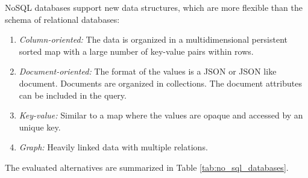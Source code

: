 \acs{NoSQL} databases support new data structures, which are more flexible than the schema of relational databases:
 \begin{enumerate}
 	\item \textit{Column-oriented:} The data is organized in a multidimensional persistent sorted map with a large number of key-value pairs within rows.
  	\item \textit{Document-oriented:} The format of the values is a JSON or JSON like document. Documents are organized in collections. The document attributes can be included in the query.
  	\item \textit{Key-value:} Similar to a map where the values are opaque and accessed by an unique key.
  	\item \textit{Graph:} Heavily linked data with multiple relations.
  \end{enumerate} 

The evaluated alternatives are summarized in Table \ref{tab:no_sql_databases}. 

